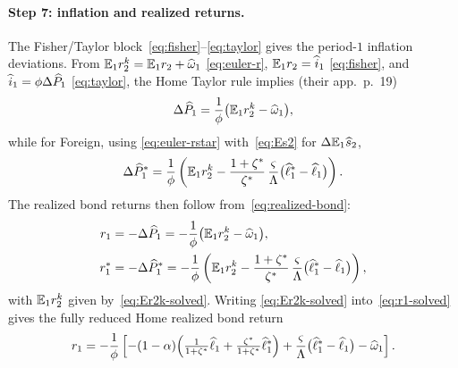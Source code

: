 \paragraph{Step 7: inflation and realized returns.} The Fisher/Taylor
block~\eqref{eq:fisher}--\eqref{eq:taylor} gives the period-$1$ inflation
deviations. From $\mathbb{E}_1r^{k}_2=\mathbb{E}_1r_2+\widehat{\omega}_1$ \eqref{eq:euler-r},
$\mathbb{E}_1r_2=\widehat{i}_1$ \eqref{eq:fisher}, and $\widehat{i}_1=\phi\Delta\widehat{P}_1$
\eqref{eq:taylor}, the Home Taylor rule implies (their app.~p.~19)
\begin{equation}
\Delta\widehat{P}_1 = \frac{1}{\phi}\bigl(\mathbb{E}_1r^{k}_2-\widehat{\omega}_1\bigr), \label{eq:dP1}
\end{equation}
while for Foreign, using \eqref{eq:euler-rstar} with~\eqref{eq:Es2} for
$\Delta\mathbb{E}_1\widehat{s}_2$,
\begin{equation}
\Delta\widehat{P}^{*}_1 = \frac{1}{\phi}\left(\mathbb{E}_1r^{k}_2 - \frac{1+\zeta^{*}}{\zeta^{*}}\,
\frac{\varsigma}{\Lambda}\bigl(\widehat{\ell}^{*}_1-\widehat{\ell}_1\bigr)\right). \label{eq:dPstar1}
\end{equation}
The realized bond returns then follow from~\eqref{eq:realized-bond}:
\begin{align}
r_1 &= -\Delta\widehat{P}_1 = -\frac{1}{\phi}\bigl(\mathbb{E}_1r^{k}_2-\widehat{\omega}_1\bigr), \label{eq:r1-solved}\\
r^{*}_1 &= -\Delta\widehat{P}^{*}_1 = -\frac{1}{\phi}\left(\mathbb{E}_1r^{k}_2 - \frac{1+\zeta^{*}}{\zeta^{*}}\,\frac{\varsigma}{\Lambda}\bigl(\widehat{\ell}^{*}_1-\widehat{\ell}_1\bigr)\right), \label{eq:rstar1-solved}
\end{align}
with $\mathbb{E}_1r^{k}_2$ given by~\eqref{eq:Er2k-solved}. Writing
\eqref{eq:Er2k-solved} into~\eqref{eq:r1-solved} gives the fully reduced Home
realized bond return
\begin{equation}
r_1 = -\frac{1}{\phi}\left[-(1-\alpha)\Bigl(\tfrac{1}{1+\zeta^{*}}\widehat{\ell}_1+\tfrac{\zeta^{*}}{1+\zeta^{*}}\widehat{\ell}^{*}_1\Bigr)
+\frac{\varsigma}{\Lambda}\bigl(\widehat{\ell}^{*}_1-\widehat{\ell}_1\bigr)-\widehat{\omega}_1\right]. \label{eq:r1-full}
\end{equation}

